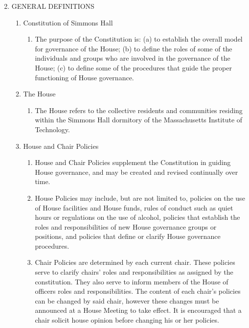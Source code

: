 \documentclass[letterpaper]{article}
\begin{document}
\begin{enumerate}
\setcounter{enumi}{1} %
\item GENERAL DEFINITIONS 

\begin{enumerate}

\item Constitution of Simmons Hall 

\begin{enumerate}

\item The purpose of the Constitution is: (a) to establish the overall model for governance of the House; (b) to define the roles of some of the individuals and groups who are involved in the governance of the House; (c) to define some of the procedures that guide the proper functioning of House governance.

\end{enumerate}

\item The House 

\begin{enumerate}

\item The House refers to the collective residents and communities residing within the Simmons Hall dormitory of the Massachusetts Institute of Technology. 

\end{enumerate}

\item House and Chair Policies

\begin{enumerate}

\item House and Chair Policies supplement the Constitution in guiding House governance, and may be created and revised continually over time.

\item House Policies may include, but are not limited to, policies on the use of House facilities and House funds, rules of conduct such as quiet hours or regulations on the use of alcohol, policies that establish the roles and responsibilities of new House governance groups or positions, and policies that define or clarify House governance procedures.

\item Chair Policies are determined by each current chair. These policies serve to clarify chairs' roles and responsibilities as assigned by the constitution. They also serve to inform members of the House of officers roles and responsibilities. The content of each chair's policies can be changed by said chair, however these changes must be announced at a House Meeting to take effect. It is encouraged that a chair solicit house opinion before changing his or her policies.


\end{enumerate}
\end{enumerate}
\end{enumerate}
\end{document}
